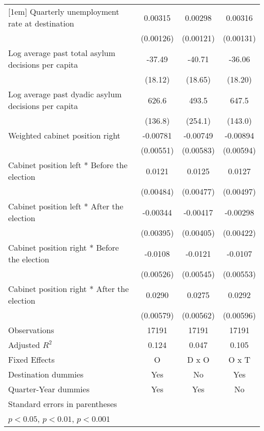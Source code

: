 \begin{table}[htbp]
\begin{tabular}{l*{3}{c}}
[1em]
Quarterly unemployment rate at destination&     0.00315\sym{*}  &     0.00298\sym{*}  &     0.00316\sym{*}  \\
                    &   (0.00126)         &   (0.00121)         &   (0.00131)         \\
[1em]
Log average past total asylum decisions per capita&      -37.49\sym{*}  &      -40.71\sym{*}  &      -36.06         \\
                    &     (18.12)         &     (18.65)         &     (18.20)         \\
[1em]
Log average past dyadic asylum decisions per capita&       626.6\sym{***}&       493.5         &       647.5\sym{***}\\
                    &     (136.8)         &     (254.1)         &     (143.0)         \\
[1em]
Weighted cabinet position right&    -0.00781         &    -0.00749         &    -0.00894         \\
                    &   (0.00551)         &   (0.00583)         &   (0.00594)         \\
[1em]
Cabinet position left * Before the election&      0.0121\sym{*}  &      0.0125\sym{*}  &      0.0127\sym{*}  \\
                    &   (0.00484)         &   (0.00477)         &   (0.00497)         \\
[1em]
Cabinet position left * After the election&    -0.00344         &    -0.00417         &    -0.00298         \\
                    &   (0.00395)         &   (0.00405)         &   (0.00422)         \\
[1em]
Cabinet position right * Before the election&     -0.0108\sym{*}  &     -0.0121\sym{*}  &     -0.0107         \\
                    &   (0.00526)         &   (0.00545)         &   (0.00553)         \\
[1em]
Cabinet position right * After the election&      0.0290\sym{***}&      0.0275\sym{***}&      0.0292\sym{***}\\
                    &   (0.00579)         &   (0.00562)         &   (0.00596)         \\
\hline
Observations        &       17191         &       17191         &       17191         \\
Adjusted \(R^{2}\)  &       0.124         &       0.047         &       0.105         \\
Fixed Effects       &           O         &       D x O         &       O x T         \\
Destination dummies &         Yes         &          No         &         Yes         \\
Quarter-Year dummies&         Yes         &         Yes         &          No         \\
\hline\hline
\multicolumn{4}{l}{\footnotesize Standard errors in parentheses}\\
\multicolumn{4}{l}{\footnotesize \sym{*} \(p<0.05\), \sym{**} \(p<0.01\), \sym{***} \(p<0.001\)}\\
\end{tabular}
\end{table}
